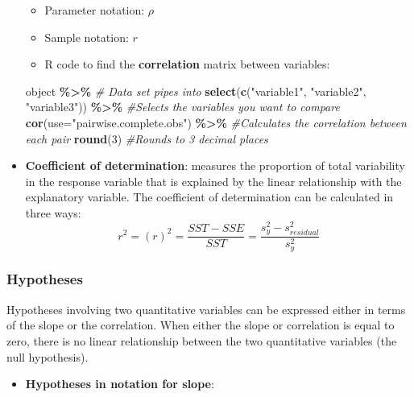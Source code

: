 \documentclass[
]{report}
\newenvironment{Shaded}{\begin{snugshade}}{\end{snugshade}}
\newcommand{\AttributeTok}[1]{\textcolor[rgb]{0.13,0.29,0.53}{#1}}
\newcommand{\CommentTok}[1]{\textcolor[rgb]{0.56,0.35,0.01}{\textit{#1}}}
\newcommand{\DecValTok}[1]{\textcolor[rgb]{0.00,0.00,0.81}{#1}}
\newcommand{\FunctionTok}[1]{\textcolor[rgb]{0.13,0.29,0.53}{\textbf{#1}}}
\newcommand{\NormalTok}[1]{#1}
\newcommand{\SpecialCharTok}[1]{\textcolor[rgb]{0.81,0.36,0.00}{\textbf{#1}}}
\newcommand{\StringTok}[1]{\textcolor[rgb]{0.31,0.60,0.02}{#1}}
\providecommand{\tightlist}{%
  \setlength{\itemsep}{0pt}\setlength{\parskip}{0pt}}
\begin{document}
\begin{itemize}
  \begin{itemize}
  \item
    Parameter notation: \(\rho\)
  \item
    Sample notation: \(r\)
  \item
    R code to find the \textbf{correlation} matrix between variables:
  \end{itemize}

\begin{Shaded}
\begin{Highlighting}[]
\NormalTok{object }\SpecialCharTok{\%\textgreater{}\%}  \CommentTok{\# Data set pipes into}
    \FunctionTok{select}\NormalTok{(}\FunctionTok{c}\NormalTok{(}\StringTok{"variable1"}\NormalTok{, }\StringTok{"variable2"}\NormalTok{, }\StringTok{"variable3"}\NormalTok{)) }\SpecialCharTok{\%\textgreater{}\%} 
    \CommentTok{\#Selects the variables you want to compare}
    \FunctionTok{cor}\NormalTok{(}\AttributeTok{use=}\StringTok{"pairwise.complete.obs"}\NormalTok{) }\SpecialCharTok{\%\textgreater{}\%}  \CommentTok{\#Calculates the correlation between each pair}
    \FunctionTok{round}\NormalTok{(}\DecValTok{3}\NormalTok{) }\CommentTok{\#Rounds to 3 decimal places}
\end{Highlighting}
\end{Shaded}
\item
  \textbf{Coefficient of determination}: measures the proportion of total variability in the response variable that is explained by the linear relationship with the explanatory variable. The coefficient of determination can be calculated in three ways:
  \[r^2 = (r)^2 = \frac{SST - SSE}{SST} = \frac{s^2_y - s^2_{residual}}{s^2_y}\]
\end{itemize}

\subsubsection*{Hypotheses}\label{hypotheses-2}

Hypotheses involving two quantitative variables can be expressed either in terms of the slope or the correlation. When either the slope or correlation is equal to zero, there is no linear relationship between the two quantitative variables (the null hypothesis).

\begin{itemize}
\tightlist
\item
  \textbf{Hypotheses in notation for slope}:
\end{itemize}
\end{document}
